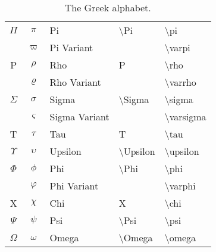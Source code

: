 \begin{table}[!htb]
\begin{tabularx}{\linewidth}{ c c l l l }
  $\Pi$           & $\pi$      & Pi      & \textbackslash Pi     & \textbackslash pi \\
                  & $\varpi$ & Pi Variant &                      & \textbackslash varpi \\
  P               & $\rho$     & Rho     & P                     & \textbackslash rho \\
                  & $\varrho$ & Rho Variant &                  & \textbackslash varrho \\
  $\Sigma$        & $\sigma$   & Sigma   & \textbackslash Sigma  & \textbackslash sigma \\
                  & $\varsigma$ & Sigma Variant &                  & \textbackslash varsigma \\
  T               & $\tau$     & Tau     & T                     & \textbackslash tau \\
  $\Upsilon$      & $\upsilon$ & Upsilon & \textbackslash Upsilon & \textbackslash upsilon \\
  $\Phi$          & $\phi$     & Phi     & \textbackslash Phi    & \textbackslash phi \\
                  & $\varphi$ & Phi Variant &                  & \textbackslash varphi \\
  X               & $\chi$     & Chi     & X                     & \textbackslash chi \\
  $\Psi$          & $\psi$     & Psi     & \textbackslash Psi    & \textbackslash psi \\
  $\Omega$        & $\omega$   & Omega   & \textbackslash Omega  & \textbackslash omega    
\end{tabularx}
\caption{The Greek alphabet.}
\label{tab:GreekAlphabet}
\end{table}
